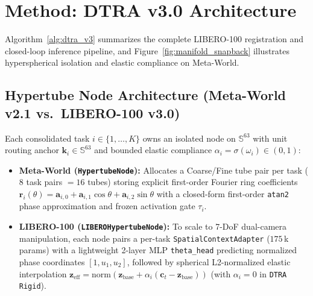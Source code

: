 \documentclass[10pt]{article}
\begin{document}
\section{Method: DTRA v3.0 Architecture}
\label{sec:method}

Algorithm~\ref{alg:dtra_v3} summarizes the complete LIBERO-100 registration and closed-loop inference pipeline, and Figure~\ref{fig:manifold_snapback} illustrates hyperspherical isolation and elastic compliance on Meta-World.

\subsection{Hypertube Node Architecture (Meta-World v2.1 vs.\ LIBERO-100 v3.0)}
\label{sec:node_arch}
Each consolidated task $i \in \{1,\dots,K\}$ owns an isolated node on $\mathbb{S}^{63}$ with unit routing anchor $\mathbf{k}_i \in \mathbb{S}^{63}$ and bounded elastic compliance $\alpha_i = \sigma(\omega_i) \in (0,1)$:
\begin{itemize}[leftmargin=*,itemsep=1.5pt]
  \item \textbf{Meta-World (\texttt{HypertubeNode}):} Allocates a Coarse/Fine tube pair per task ($8$ task pairs $= 16$ tubes) storing explicit first-order Fourier ring coefficients $\mathbf{r}_i(\theta) = \mathbf{a}_{i,0} + \mathbf{a}_{i,1}\cos\theta + \mathbf{a}_{i,2}\sin\theta$ with a closed-form first-order \texttt{atan2} phase approximation and frozen activation gate $\tau_i$.
  \item \textbf{LIBERO-100 (\texttt{LIBEROHypertubeNode}):} To scale to 7-DoF dual-camera manipulation, each node pairs a per-task \texttt{SpatialContextAdapter} ($175\,$k params) with a lightweight 2-layer MLP \texttt{theta\_head} predicting normalized phase coordinates $[1, u_1, u_2]$, followed by spherical L2-normalized elastic interpolation $\mathbf{z}_{\text{eff}} = \mathrm{norm}(\mathbf{z}_{\text{base}} + \alpha_i(\mathbf{c}_t - \mathbf{z}_{\text{base}}))$ (with $\alpha_i=0$ in \texttt{DTRA Rigid}).
\end{itemize}
\end{document}
